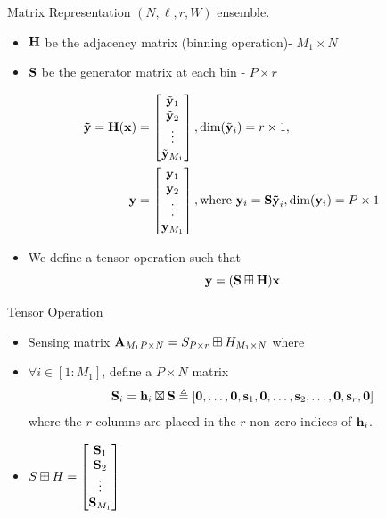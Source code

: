 \documentclass[10pt]{beamer}
\begin{document}
\begin{frame}{Matrix Representation}
$(N,\ell,r,W)$ ensemble. 
\begin{itemize}
\item $\mathbf{H}$ be the adjacency matrix (binning operation)- $M_1 \times N$
\item $\mathbf{S}$ be the generator matrix at each bin - $P \times r$
\end{itemize}
\begin{align*}
\mbf{\tilde{y}=H(x)}&= 
\begin{bmatrix}
   \tilde{\mbf{ y}}_{1} \\
   \tilde{ \mbf{y}}_{2} \\
    \vdots \\
   \tilde{\mbf{y}}_{M_1}
\end{bmatrix}
,\text{dim}(\tilde{\mbf{y}}_{i} )=r \times 1,
\\
\vspace{10pt}
\mbf{y}&= 
\begin{bmatrix}
   \mbf{ y}_{1}\\
    \mbf{y}_{2}  \\
    \vdots \\
    \mbf{y}_{M_1}
\end{bmatrix}
, \text{where } \mbf{y}_i= \mbf{S \tilde{y}}_{i}, \text{dim} (\mbf{y}_i)=P \times 1   
\end{align*}
\begin{itemize}
\item We define a tensor operation such that 
\begin{equation*}
\mathbf{y=(S\boxplus H)  x}
\end{equation*}
\end{itemize}
\end{frame}


\begin{frame}{Tensor Operation}
\begin{itemize}
\item Sensing matrix $\mathbf{A}_{M_{1}P\times N}= S_{P\times r}\boxplus H_{M_{1}\times N}$ where
\vspace{2ex}
\item $\forall i\in [1:M_1]$, define a $P\times N$ matrix
\begin{equation*}
\mathbf{S}_i=\mathbf{h}_i \boxtimes \mathbf{S}\triangleq [\mathbf{0},\ldots,\mathbf{0},\mathbf{s}_1,\mathbf{0},\ldots,\mathbf{s}_2,\ldots,\mathbf{0},\mathbf{s}_r,\mathbf{0}]
\end{equation*}
where the $r$ columns are placed in the $r$ non-zero indices of $\mathbf{h}_i$.
\vspace{2ex}
\item $S\boxplus H=\begin{bmatrix}
\mathbf{S}_1\\
\mathbf{S}_2\\
\vdots\\
\mathbf{S}_{M_1}
\end{bmatrix}
$
\end{itemize}
\end{frame}
\end{document}
